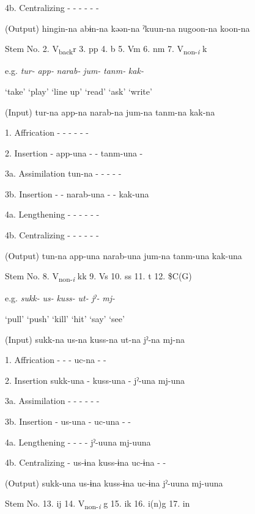 4b.  Centralizing  {}-  {}-  {}-  {}-  {}-  {}-

  (Output)  hingin-na  abɨn-na  kəən-na  ˀkuun-na  nugoon-na  koon-na

Stem No.  2. V\textsubscript{back}r  3. pp  4. b  5. Vm  6. nm  7. V\textsubscript{non-}\textit{\textsubscript{i} }k

  e.g.  \textit{tur-}  \textit{app-}  \textit{narab-}  \textit{jum-}  \textit{tanm-}  \textit{kak-}

    ‘take’  ‘play’  ‘line up’  ‘read’  ‘ask’  ‘write’

  (Input)  tur-na  app-na  narab-na  jum-na  tanm-na  kak-na

1.  Affrication  {}-  {}-  {}-  {}-  {}-  {}-

2.  Insertion  {}-  app-una  {}-  {}-  tanm-una  {}-

3a.  Assimilation  tun-na  {}-  {}-  {}-  {}-  {}-

3b.  Insertion  {}-  {}-  narab-una  {}-  {}-  kak-una

4a.  Lengthening  {}-  {}-  {}-  {}-  {}-  {}-

4b.  Centralizing  {}-  {}-  {}-  {}-  {}-  {}-

  (Output)  tun-na  app-una  narab-una  jum-na  tanm-una  kak-una

  Stem No.  8. V\textsubscript{non-}\textit{\textsubscript{i} }kk  9. Vs  10. ss  11. t  12. \$C(G)

  e.g.  \textit{sukk-}  \textit{us-}  \textit{kuss-}  \textit{ut-}  \textit{jˀ-}  \textit{mj-}

    ‘pull’  ‘push’  ‘kill’  ‘hit’  ‘say’  ‘see’

  (Input)  sukk-na  us-na  kuss-na  ut-na  jˀ-na  mj-na

1.  Affrication  {}-  {}-  {}-  uc-na  {}-  {}-

2.  Insertion  sukk-una  {}-  kuss-una  {}-  jˀ-una  mj-una

3a.  Assimilation  {}-  {}-  {}-  {}-  {}-  {}-

3b.  Insertion  {}-  us-una  {}-  uc-una  {}-  {}-

4a.  Lengthening  {}-  {}-  {}-  {}-  jˀ-uuna  mj-uuna

4b.  Centralizing  {}-  us-ɨna  kuss-ɨna  uc-ɨna  {}-  {}-

  (Output)  sukk-una  us-ɨna  kuss-ɨna  uc-ɨna  jˀ-uuna  mj-uuna

  Stem No.  13. ij  14. V\textsubscript{non-}\textit{\textsubscript{i}} g  15. ik  16. i(n)g    17. in

